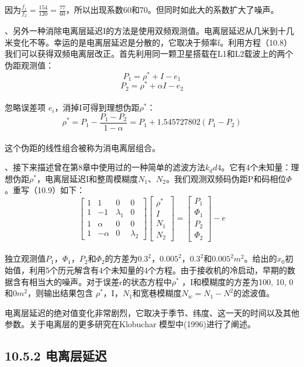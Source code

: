 因为$\frac{f_{1}}{f_{2}}=\frac{154}{120}=\frac{77}{60}$，所以出现系数60和70。但同时如此大的系数扩大了噪声。

\uppercase\expandafter{}、另外一种消除电离层延迟I的方法是使用双频观测值。电离层延迟从几米到十几米变化不等。幸运的是电离层延迟是分散的，它取决于频率f。利用方程（10.8）我们可以获得双频电离层改正。首先利用同一颗卫星搭载在L1和L2载波上的两个伪距观测值：
$$
P_{1}=\rho^{*}+I-e_{1}
$$
$$
P_{2}=\rho^{*}+\alpha I-e_{2}
$$\\
忽略误差项 $e_{i}$，消掉I可得到理想伪距$\rho^{*}$：
$$
\rho^{*}=P_{1}-\frac{P_{1}-P_{2}}{1-\alpha}=P_{1}+1.545727802(P_{1}-P_{2})
$$\\
这个伪距的线性组合被称为消电离层组合。

\uppercase\expandafter{}、接下来描述曾在第8章中使用过的一种简单的滤波方法$k_dd4$。它有4个未知量：理想伪距$\rho^{*}$，电离层延迟I和整周模糊度$N_{1}$、$N_{2}$。我们观测双频码伪距P和码相位$\Phi$。重写（10.9）如下：
$$
\begin{bmatrix}
1&1&0&0\\
1&-1&\lambda_{1}&0\\
1&\alpha&0&0\\
1&-\alpha&0&\lambda_{2}
\end{bmatrix}
\begin{bmatrix}
\rho^{*}\\I\\N_{1}\\N_{2}
\end{bmatrix}
=
\begin{bmatrix}
P_{1}\\\Phi_{1}\\P_{2}\\\Phi_{2}
\end{bmatrix}
-e
$$\\
独立观测值$P_{1}$，$\Phi_{1}$，$P_{2}$和$\Phi_{2}$的方差为$0.3^{2}$，$0.005^{2}$，$0.3^{2}$和$0.005^{2}m^{2}$。给出的$x_{0}$初始值，利用5个历元解含有4个未知量的4个方程。由于接收机的冷启动，早期的数据含有相当大的噪声。对于误差$\epsilon$的状态方程中$\rho^{*}$ ，I和模糊度的方差为100, 10, 0和0$m^{2}$，则输出结果包含 $\rho^{*}$，I，$N_{1}$和宽巷模糊度$N_{w}=N_{1}-N^{2}$的滤波值。

电离层延迟的绝对值变化非常剧烈，它取决于季节、纬度、这一天的时间以及其他参数。关于电离层的更多研究在Klobuchar 模型中(1996)进行了阐述。

\subsection{10.5.2 电离层延迟}

